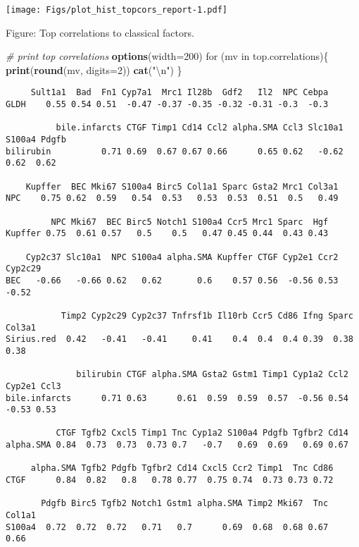 \documentclass[]{article}
\newenvironment{Shaded}{\begin{snugshade}}{\end{snugshade}}
\newcommand{\KeywordTok}[1]{\textcolor[rgb]{0.13,0.29,0.53}{\textbf{{#1}}}}
\newcommand{\DataTypeTok}[1]{\textcolor[rgb]{0.13,0.29,0.53}{{#1}}}
\newcommand{\DecValTok}[1]{\textcolor[rgb]{0.00,0.00,0.81}{{#1}}}
\newcommand{\CharTok}[1]{\textcolor[rgb]{0.31,0.60,0.02}{{#1}}}
\newcommand{\StringTok}[1]{\textcolor[rgb]{0.31,0.60,0.02}{{#1}}}
\newcommand{\CommentTok}[1]{\textcolor[rgb]{0.56,0.35,0.01}{\textit{{#1}}}}
\newcommand{\NormalTok}[1]{{#1}}
\begin{document}
\texttt{[image: Figs/plot\_hist\_topcors\_report-1.pdf]}

Figure: Top correlations to classical factors.

\small

\begin{Shaded}
\begin{Highlighting}[]
\CommentTok{# print top correlations}
\KeywordTok{options}\NormalTok{(}\DataTypeTok{width=}\DecValTok{200}\NormalTok{)}
\NormalTok{for (mv in top.correlations)\{}
  \KeywordTok{print}\NormalTok{(}\KeywordTok{round}\NormalTok{(mv, }\DataTypeTok{digits=}\DecValTok{2}\NormalTok{)) }
  \KeywordTok{cat}\NormalTok{(}\StringTok{"}\CharTok{\textbackslash{}n}\StringTok{"}\NormalTok{)}
\NormalTok{\}}
\end{Highlighting}
\end{Shaded}

\begin{verbatim}
     Sult1a1  Bad  Fn1 Cyp7a1  Mrc1 Il28b  Gdf2   Il2  NPC Cebpa
GLDH    0.55 0.54 0.51  -0.47 -0.37 -0.35 -0.32 -0.31 -0.3  -0.3

          bile.infarcts CTGF Timp1 Cd14 Ccl2 alpha.SMA Ccl3 Slc10a1 S100a4 Pdgfb
bilirubin          0.71 0.69  0.67 0.67 0.66      0.65 0.62   -0.62   0.62  0.62

    Kupffer  BEC Mki67 S100a4 Birc5 Col1a1 Sparc Gsta2 Mrc1 Col3a1
NPC    0.75 0.62  0.59   0.54  0.53   0.53  0.53  0.51  0.5   0.49

         NPC Mki67  BEC Birc5 Notch1 S100a4 Ccr5 Mrc1 Sparc  Hgf
Kupffer 0.75  0.61 0.57   0.5    0.5   0.47 0.45 0.44  0.43 0.43

    Cyp2c37 Slc10a1  NPC S100a4 alpha.SMA Kupffer CTGF Cyp2e1 Ccr2 Cyp2c29
BEC   -0.66   -0.66 0.62   0.62       0.6    0.57 0.56  -0.56 0.53   -0.52

           Timp2 Cyp2c29 Cyp2c37 Tnfrsf1b Il10rb Ccr5 Cd86 Ifng Sparc Col3a1
Sirius.red  0.42   -0.41   -0.41     0.41    0.4  0.4  0.4 0.39  0.38   0.38

              bilirubin CTGF alpha.SMA Gsta2 Gstm1 Timp1 Cyp1a2 Ccl2 Cyp2e1 Ccl3
bile.infarcts      0.71 0.63      0.61  0.59  0.59  0.57  -0.56 0.54  -0.53 0.53

          CTGF Tgfb2 Cxcl5 Timp1 Tnc Cyp1a2 S100a4 Pdgfb Tgfbr2 Cd14
alpha.SMA 0.84  0.73  0.73  0.73 0.7   -0.7   0.69  0.69   0.69 0.67

     alpha.SMA Tgfb2 Pdgfb Tgfbr2 Cd14 Cxcl5 Ccr2 Timp1  Tnc Cd86
CTGF      0.84  0.82   0.8   0.78 0.77  0.75 0.74  0.73 0.73 0.72

       Pdgfb Birc5 Tgfb2 Notch1 Gstm1 alpha.SMA Timp2 Mki67  Tnc Col1a1
S100a4  0.72  0.72  0.72   0.71   0.7      0.69  0.68  0.68 0.67   0.66
\end{verbatim}
\end{document}
